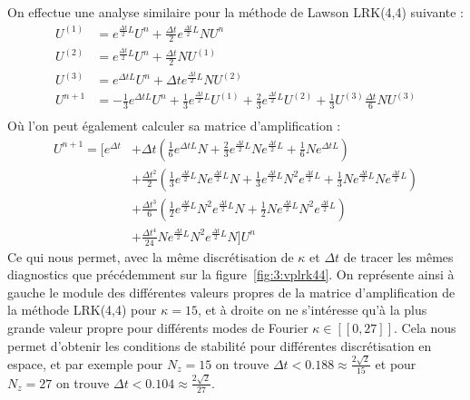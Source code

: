 On effectue une analyse similaire pour la méthode de Lawson LRK(4,4) suivante :
$$
  \begin{aligned}
    U^{(1)} &= e^{\frac{\Delta t}{2}L}U^n + \frac{\Delta t}{2}e^{\frac{\Delta t}{2}L}NU^n \\
    U^{(2)} &= e^{\frac{\Delta t}{2}L}U^n + \frac{\Delta t}{2}NU^{(1)} \\
    U^{(3)} &= e^{\Delta tL}U^n + \Delta te^{\frac{\Delta t}{2}L}NU^{(2)} \\
    U^{n+1} &= -\frac{1}{3}e^{\Delta tL}U^n + \frac{1}{3}e^{\frac{\Delta t}{2}L}U^{(1)} + \frac{2}{3}e^{\frac{\Delta t}{2}L}U^{(2)} + \frac{1}{3}U^{(3)} \frac{\Delta t}{6}NU^{(3)} \\
  \end{aligned}
$$
Où l'on peut également calculer sa matrice d'amplification :
$$
  \begin{aligned}
    U^{n+1} = \Big[ e^{\Delta t} 
              & + \Delta t\left( \frac{1}{6}e^{\Delta t L}N + \frac{2}{3}e^{\frac{\Delta t}{2}L}Ne^{\frac{\Delta t}{2}L} + \frac{1}{6}Ne^{\Delta t L} \right) \\
              & + \frac{\Delta t^2}{2} \left( \frac{1}{3}e^{\frac{\Delta t}{2}L}Ne^{\frac{\Delta t}{2}L}N + \frac{1}{3}e^{\frac{\Delta t}{2}L}N^2e^{\frac{\Delta t}{2}L} + \frac{1}{3}Ne^{\frac{\Delta t}{2}L}Ne^{\frac{\Delta t}{2}L} \right) \\
              & + \frac{\Delta t^3}{6} \left( \frac{1}{2}e^{\frac{\Delta t}{2}L}N^2e^{\frac{\Delta t}{2}L}N + \frac{1}{2}Ne^{\frac{\Delta t}{2}L}N^2e^{\frac{\Delta t}{2}L} \right) \\
              & + \frac{\Delta t^4}{24}Ne^{\frac{\Delta t}{2}L}N^2e^{\frac{\Delta t}{2}L}N \Big]U^n
  \end{aligned}
$$
Ce qui nous permet, avec la même discrétisation de $\kappa$ et $\Delta t$ de tracer les mêmes diagnostics que précédemment sur la figure~\ref{fig:3:vplrk44}. On représente ainsi à gauche le module des différentes valeurs propres de la matrice d'amplification de la méthode LRK(4,4) pour $\kappa=15$, et à droite on ne s'intéresse qu'à la plus grande valeur propre pour différents modes de Fourier $\kappa\in[\![0,27]\!]$. Cela nous permet d'obtenir les conditions de stabilité pour différentes discrétisation en espace, et par exemple pour $N_z = 15$ on trouve $\Delta t<0.188 \approx \frac{2\sqrt{2}}{15}$ et pour $N_z = 27$ on trouve $\Delta t < 0.104 \approx \frac{2\sqrt{2}}{27}$.
